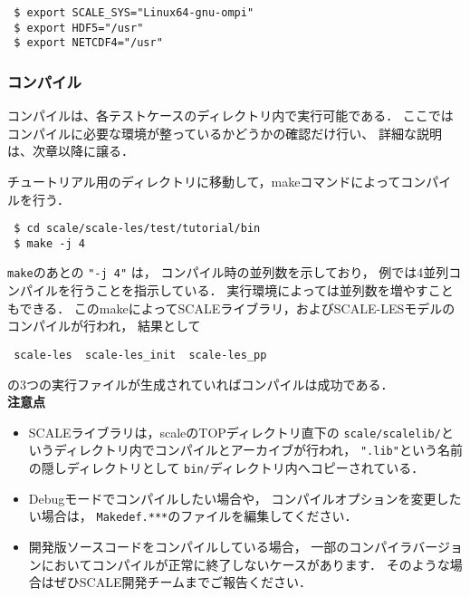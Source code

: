\begin{verbatim}
 $ export SCALE_SYS="Linux64-gnu-ompi"
 $ export HDF5="/usr"
 $ export NETCDF4="/usr"
\end{verbatim}


\subsubsection{コンパイル}
コンパイルは、各テストケースのディレクトリ内で実行可能である．
ここではコンパイルに必要な環境が整っているかどうかの確認だけ行い、
詳細な説明は、次章以降に譲る．

チュートリアル用のディレクトリに移動して，makeコマンドによってコンパイルを行う．
\begin{verbatim}
 $ cd scale/scale-les/test/tutorial/bin
 $ make -j 4
\end{verbatim}
\verb|make|のあとの \verb|"-j 4"| は，
コンパイル時の並列数を示しており，
例では4並列コンパイルを行うことを指示している．
実行環境によっては並列数を増やすこともできる．
このmakeによってSCALEライブラリ，およびSCALE-LESモデルのコンパイルが行われ，
結果として
\begin{verbatim}
 scale-les  scale-les_init  scale-les_pp
\end{verbatim}
の3つの実行ファイルが生成されていればコンパイルは成功である．\\


{\bf 注意点}
\begin{itemize}
\item SCALEライブラリは，scaleのTOPディレクトリ直下の
 \verb|scale/scalelib/|というディレクトリ内でコンパイルとアーカイブが行われ，
 \verb|".lib"|という名前の隠しディレクトリとして
 \verb|bin/|ディレクトリ内へコピーされている．
\item Debugモードでコンパイルしたい場合や，
 コンパイルオプションを変更したい場合は，
 \verb|Makedef.***|のファイルを編集してください．
\item 開発版ソースコードをコンパイルしている場合，
 一部のコンパイラバージョンにおいてコンパイルが正常に終了しないケースがあります．
 そのような場合はぜひSCALE開発チームまでご報告ください．
\end{itemize}



